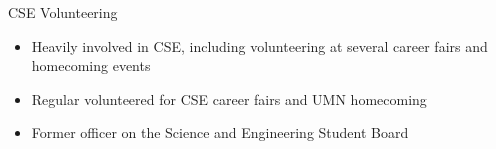 \documentclass[margin]{res}
\begin{document}
\begin{resume}
                CSE Volunteering
                \begin{itemize} \itemsep -2pt
                \item Heavily involved in CSE, including volunteering at several career fairs and homecoming events
                \item Regular volunteered for CSE career fairs and UMN homecoming
                \item Former officer on the Science and Engineering Student Board
                \end{itemize}

\end{resume}
\end{document}

